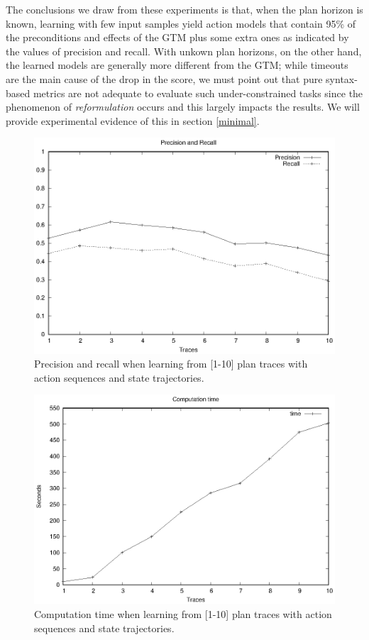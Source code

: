 The conclusions we draw from these experiments is that, when the plan horizon is known, learning with few input samples yield action models that contain 95\% of the preconditions and effects of the GTM plus some extra ones as indicated by the values of precision and recall. With unkown plan horizons, on the other hand, the learned models are generally more different from the GTM; while timeouts are the main cause of the drop in the score, we must point out that pure syntax-based metrics are not adequate to evaluate such under-constrained tasks since the phenomenon of \emph{reformulation} occurs and this largely impacts the results. We will provide experimental evidence of this in section \ref{minimal}.





\begin{figure}[hbt!]
	\centering
	\includegraphics[width=0.65\linewidth]{figures/input_size_0_0_precision.eps}
	\caption{Precision and recall when learning from [1-10] plan traces with \NO action sequences and \NO state trajectories.}
	\label{fig:pspace_quality}
\end{figure}
\begin{figure}[hbt!]
	\centering
	\includegraphics[width=0.65\linewidth]{figures/input_size_0_0_time.eps}
	\caption{Computation time when learning from [1-10] plan traces with \NO action sequences and \NO state trajectories.}
	\label{fig:pspace_time}
\end{figure}

